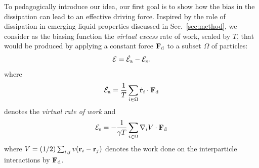 \documentclass[superscriptaddress, twocolumn, prx, longbibliography, nofootinbib]{revtex4-1}
\newcommand{\tn}[1]{{\color{red}#1}}
\begin{document}
\tn{To pedagogically introduce our idea,} our first goal is to show %
\tn{how the bias in the dissipation can lead to an effective driving force.}
Inspired by the role of dissipation in emerging liquid properties discussed in Sec.~\ref{sec:method}, we consider as the biasing function %
the {\it \tn{virtual excess}} rate of work, scaled by $T$, that would be produced by applying a constant force ${\bf F}_{\rm d}$ to a subset $\Omega$ of %
particles:
\tn{
\begin{equation}\label{eq:eps}%
	{\cal E} = \dot{{\cal E}}_{\rm a} - {\cal E}_{\rm s}  .
\end{equation}
where 
\begin{equation}
    \dot{{\cal E}}_{\rm a} = \frac{1}{ T}\sum_{i\in\Omega}\dot{{\bf r}}_i \cdot {\bf F}_{\rm d}
\end{equation}
denotes the {\it virtual rate of work} and 
\begin{equation}
{\cal E}_{\rm s} = - \frac{1}{\gamma T}\sum_{i\in\Omega}\nabla_i V \cdot {\bf F}_{\rm d}
\end{equation}
where $V=(1/2)\sum_{i,j}v({\bf r}_i-{\bf r}_j)$ denotes the work done on the interparticle interactions by ${\bf F}_{\rm d}$. 
}
%
\end{document}
